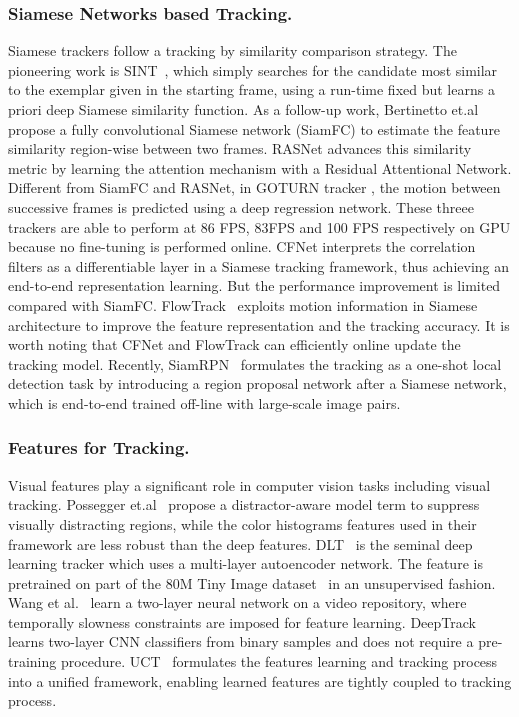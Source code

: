 \documentclass[runningheads]{llncs}
\begin{document}
\subsubsection{Siamese Networks based Tracking.}
Siamese trackers follow a tracking by similarity comparison strategy.
The pioneering work is SINT~\cite{SINT}, which simply searches for the candidate most similar to the exemplar given in the starting frame, using a run-time fixed but learns a priori deep Siamese similarity function.
As a follow-up work, Bertinetto et.al \cite{SiamFC} propose a fully convolutional Siamese network (SiamFC) to estimate the feature similarity region-wise between two frames. RASNet \cite{RASNet} advances this similarity metric by learning the attention mechanism with a Residual Attentional Network.
Different from SiamFC and RASNet, in GOTURN tracker \cite{GOTURN}, the motion between successive frames is predicted using a deep regression network. These threee trackers are able to perform at 86 FPS, 83FPS and 100 FPS respectively on GPU because no fine-tuning is performed online.
CFNet \cite{CFNet} interprets the correlation filters as a differentiable layer in a Siamese tracking framework, thus achieving an end-to-end representation learning. But the performance improvement is limited compared with SiamFC.
FlowTrack~\cite{FlowTrack} exploits motion information in Siamese architecture to improve the feature representation and the tracking accuracy.
It is worth noting that CFNet and FlowTrack can efficiently online update the tracking model.
Recently, SiamRPN~\cite{SiamRPN} formulates the tracking as a one-shot local detection task by introducing a region proposal network after a Siamese network, which is end-to-end trained off-line with large-scale image pairs.


\subsubsection{Features for Tracking.}
Visual features play a significant role in computer vision tasks including visual tracking.
Possegger et.al~\cite{DAT} propose a distractor-aware model term to suppress visually distracting regions, while the color histograms features used in their framework are less robust than the deep features.
DLT~\cite{DLT} is the seminal deep learning tracker which uses a multi-layer autoencoder network. The feature is pretrained on part of the 80M Tiny Image dataset~\cite{80MTinyImage} in an unsupervised fashion. Wang et al.~\cite{wang2015video} learn a two-layer neural network on a video repository, where temporally slowness constraints are imposed for feature learning.
DeepTrack~\cite{DeepTrack} learns two-layer CNN classifiers from binary samples and does not require a pre-training procedure. UCT~\cite{UCT} formulates the features learning and tracking process into a unified framework, enabling learned features are tightly coupled to tracking process.
\end{document}
